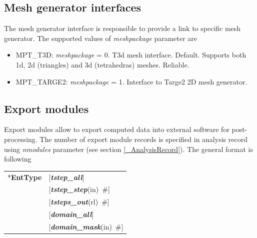 \documentclass[a4paper]{article}
\makeatletter
\newcommand{\param}[1]{{\em #1}}
\newcommand{\keywordnotype}[1]{\mbox{{\it{\bf{#1}}}}}
\newcommand{\keyword}[2]{\mbox{{\keywordnotype{#1}\tiny (#2)}}}
\newcommand{\entKeyword}[1]{\mbox{{*{\bf{#1}}}}}
\newcommand{\field}[2]{\mbox{\keyword{#1}{#2}~\#}}
\newcommand{\optField}[2]{\mbox{[\field{#1}{#2}]}}
\newenvironment{record}[1][]{\begin{tabular}{|ll}}{\end{tabular}\\}
\newcommand{\recentry}[2]{{#1}&{#2}\\}
\newcounter{rcc}
\newenvironment{record}[1][\textwidth]{\setcounter{rcc}{0}\begin{tabular*}{#1}{|ll@{\extracolsep{\fill}}r}}{\end{tabular*}\\}
\newcommand{\recentry}[2]{\ifthenelse{\value{rcc}>0}{&$\backslash$ \\}{\setcounter{rcc}{1}}{#1}&{#2}}
\makeatother
\begin{document}
\subsection{Mesh generator interfaces}
\label{meshpackages}
The mesh generator interface is responsible to provide a link to
specific mesh generator. The supported values of \param{meshpackage}
parameter are 
\begin{itemize}
\item
MPT\_T3D:  \param{meshpackage} = 0. T3d mesh interface. Default. Supports both 1d, 2d
(triangles) and 3d (tetrahedras) meshes. Reliable.
\item
MPT\_TARGE2:	\param{meshpackage} = 1. Interface to Targe2 2D
mesh generator.
\end{itemize}
%

\subsection{Export modules}
\label{ExportModulesSec}
Export modules allow to export computed data into external software for
post-processing. The number of export module records is specified in
analysis record using \param{nmodules} parameter (see section \ref{_AnalysisRecord}). The general format
is following\\
\begin{record}
\recentry{\entKeyword{EntType}}{[\keywordnotype{tstep\_all}]}
\recentry{}{\optField{tstep\_step}{in}} \recentry{}{\optField{tsteps\_out}{rl}}
\recentry{}{[\keywordnotype{domain\_all}]} \recentry{}{\optField{domain\_mask}{in}}
\end{record}
\end{document}
